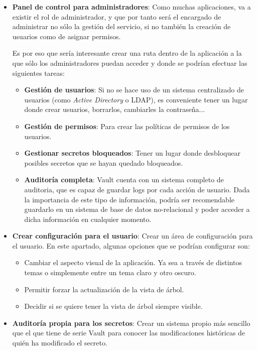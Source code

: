 \documentclass{\ClassPath/viu-tfm-template}
\begin{document}
\begin{itemize}
    \item \textbf{Panel de control para administradores}: Como muchas aplicaciones, va a existir el rol de administrador, y que por tanto será el encargado de administrar no sólo la gestión del servicio, si no también la creación de usuarios como de asignar permisos.

    Es por eso que sería interesante crear una ruta dentro de la aplicación a la que sólo los administradores puedan acceder y donde se podrían efectuar las siguientes tareas:

    \begin{itemize}
        \item \textbf{Gestión de usuarios}: Si no se hace uso de un sistema centralizado de usuarios (como \textit{Active Directory} o LDAP), es conveniente tener un lugar donde crear usuarios, borrarlos, cambiarles la contraseña...
        \item \textbf{Gestión de permisos}: Para crear las políticas de permisos de los usuarios.
        \item \textbf{Gestionar secretos bloqueados}: Tener un lugar donde desbloquear posibles secretos que se hayan quedado bloqueados.
        \item \textbf{Auditoría completa}: Vault cuenta con un sistema completo de auditoria, que es capaz de guardar logs por cada acción de usuario. Dada la importancia de este tipo de información, podría ser recomendable guardarlo en un sistema de base de datos no-relacional y poder acceder a dicha información en cualquier momento.
    \end{itemize}

    \item \textbf{Crear configuración para el usuario}: Crear un área de configuración para el usuario. En este apartado, algunas opciones que se podrían configurar son:

    \begin{itemize}
        \item Cambiar el aspecto visual de la aplicación. Ya sea a través de distintos temas o simplemente entre un tema claro y otro oscuro.
        \item Permitir forzar la actualización de la vista de árbol.
        \item Decidir si se quiere tener la vista de árbol siempre visible.
    \end{itemize}

    \item \textbf{Auditoría propia para los secretos}: Crear un sistema propio más sencillo que el que tiene de serie Vault para conocer las modificaciones históricas de quién ha modificado el secreto.


\end{itemize}
\end{document}
